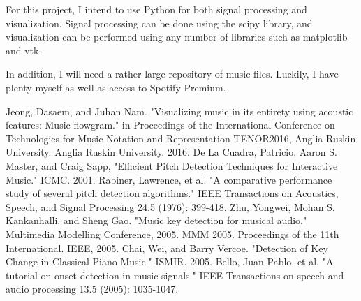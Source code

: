 \documentclass[12pt, a4paper]{article}
\begin{document}
For this project, I intend to use Python for both signal processing and
visualization. Signal processing can be done using the scipy library, and
visualization can be performed using any number of libraries such as
matplotlib and vtk.

In addition, I will need a rather large repository of music files. Luckily,
I have plenty myself as well as access to Spotify Premium.

\begin{thebibliography}{9}
 Jeong, Dasaem, and Juhan Nam. "Visualizing music in its entirety
using acoustic features: Music flowgram." in Proceedings of the International
Conference on Technologies for Music Notation and Representation-TENOR2016,
Anglia Ruskin University. Anglia Ruskin University. 2016.
 De La Cuadra, Patricio, Aaron S. Master, and Craig Sapp,
"Efficient Pitch Detection Techniques for Interactive Music." ICMC. 2001.
 Rabiner, Lawrence, et al. "A comparative performance study of several
pitch detection algorithms." IEEE Transactions on Acoustics, Speech, and Signal
Processing 24.5 (1976): 399-418.
 Zhu, Yongwei, Mohan S. Kankanhalli, and Sheng Gao. "Music key
detection for musical audio." Multimedia Modelling Conference, 2005. MMM 2005.
Proceedings of the 11th International. IEEE, 2005.
 Chai, Wei, and Barry Vercoe. "Detection of Key Change in
Classical Piano Music." ISMIR. 2005.
 Bello, Juan Pablo, et al. "A tutorial on onset detection in
music signals." IEEE Transactions on speech and audio processing 13.5 (2005):
1035-1047.
\end{thebibliography}
\end{document}
